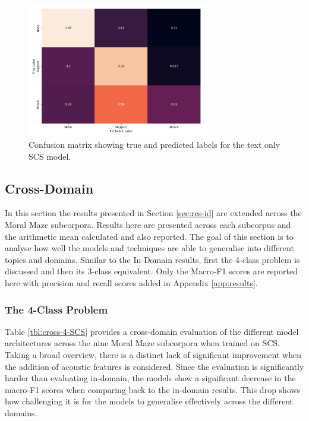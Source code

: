 \documentclass[twocolumn]{article}
\begin{document}
\begin{figure}[h]
\centering
\includegraphics[width=8cm]{text-only-conf-mat-3class}
\caption{Confusion matrix showing true and predicted labels for the text only SCS model.\label{fig:text-only-conf-mat-3class}}
\end{figure}

\subsection{Cross-Domain}\label{sec:res-cd}

In this section the results presented in Section \ref{sec:res-id} are
extended across the Moral Maze subcorpora. Results here are presented
across each subcorpus and the arithmetic mean calculated and also
reported. The goal of this section is to analyse how well the models and
techniques are able to generalise into different topics and domains.
Similar to the In-Domain results, first the 4-class problem is discussed
and then its 3-class equivalent. Only the Macro-F1 scores are reported
here with precision and recall scores added in Appendix
\ref{app:results}.

\subsubsection{The 4-Class Problem}\label{sec:cd-4class}

Table \ref{tbl:cross-4-SCS} provides a cross-domain evaluation of the
different model architectures across the nine Moral Maze subcorpora when
trained on SCS. Taking a broad overview, there is a distinct lack of
significant improvement when the addition of acoustic features is
considered. Since the evaluation is significantly harder than evaluating
in-domain, the models show a significant decrease in the macro-F1 scores
when comparing back to the in-domain results. This drop shows how
challenging it is for the models to generalise effectively across the
different domains.
\end{document}
